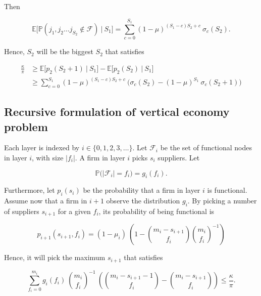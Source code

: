 \documentclass[american, abstract=on]{scrartcl}
\newcommand{\F}{\mathcal{F}}
\renewcommand{\P}{\mathbb{P}}
\newcommand{\E}{\mathbb{E}}
\newcommand{\abs}[1]{\left\lvert#1\right\rvert}
\begin{document}
Then 

\begin{equation}
  \E \Big[ \P\left( j_1, j_2 \ldots j_{S_2} \notin \F \right)\ \vert \ S_1 \Big] = \sum^{S_1}_{c = 0} (1 - \mu)^{(S_1 - c) S_2 + c} \ \sigma_c(S_2).
\end{equation}

Hence, $S_2$ will be the biggest $S_2$ that satisfies 

\begin{equation}
  \begin{split}
    \frac{\kappa}{\pi} &\geq \E \Big[ p_2(S_2 + 1) \ \vert \ S_1 \Big] - \E \Big[ p_2(S_2) \ \vert \ S_1 \Big] \\
    &\geq \sum^{S_1}_{c = 0} (1 - \mu)^{(S_1 - c) S_2 + c} \ \Bigg( \sigma_c(S_2) - (1 - \mu)^{S_1} \ \sigma_c(S_2 + 1) \Bigg)
  \end{split}
\end{equation}


\subsection{Recursive formulation of vertical economy problem}

Each layer is indexed by $i \in \{0, 1, 2, 3, \ldots\}$. Let $\F_i$ be the set of functional nodes in layer $i$, with size $\abs{f_i}$. A firm in layer $i$ picks $s_i$ suppliers. Let 

\begin{equation}
  \P\Big( \abs{\F_i} = f_i \Big) = g_i(f_i).
\end{equation}

Furthermore, let $p_i(s_i)$ be the probability that a firm in layer $i$ is functional. Assume now that a firm in $i+1$ observe the distribution $g_i$. By picking a number of suppliers $s_{i + 1}$ for a given $f_i$, its probability of being functional is

\begin{equation}
  p_{i+1}(s_{i+1}, f_i) = (1 - \mu_i) \ \left(1 - \binom{m_i - s_{i+1}}{f_i} \binom{m_i}{f_i}^{-1} \right)
\end{equation}

Hence, it will pick the maximum $s_{i+1}$ that satisfies

\begin{equation}
  \sum^{m_i}_{f_i = 0} g_i(f_i) \ \binom{m_i}{f_i}^{-1} \ \left( \binom{m_i - s_{i+1} - 1}{f_i} - \binom{m_i - s_{i+1}}{f_i} \right) \leq \frac{\kappa}{\pi}.
\end{equation}
\end{document}
